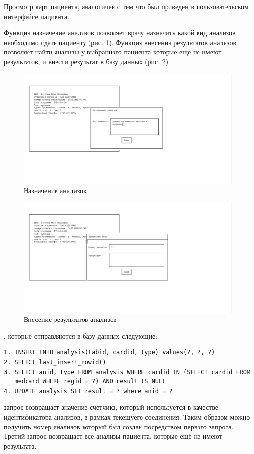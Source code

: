 \documentclass[14pt,a4paper,russian]{extreport}
\begin{document}
Просмотр карт пациента, аналогичен с тем что был приведен в пользовательском интерфейсе пациента.\par
Функция назначение анализов позволяет врачу назначить какой вид анализов необходимо сдать пациенту (рис. \ref{fig:analysis-create}).
Функция внесения результатов анализов позволяет найти анализы у выбранного пациента которые еще не имеют результатов, и внести результат в базу данных (рис. \ref{fig:analysis-update}). \par
\begin{figure}[h!]
        \includegraphics[width=\textwidth]{prog_int/analysis-create}
        \caption{Назначение анализов}
        \label{fig:analysis-create}
\end{figure}
\begin{figure}[h!]
        \includegraphics[width=\textwidth]{prog_int/analysis-update}
        \caption{Внесение результатов анализов}
        \label{fig:analysis-update}
\end{figure}
, которые отправляются в базу данных следующие: 
\begin{lstlisting}[style=csql] 
1. INSERT INTO analysis(tabid, cardid, type) values(?, ?, ?)
2. SELECT last_insert_rowid()
3. SELECT anid, type FROM analysis WHERE cardid IN (SELECT cardid FROM
   medcard WHERE regid = ?) AND result IS NULL
4. UPDATE analysis SET result = ? where anid = ?
\end{lstlisting}
 запрос возвращает значение счетчика, который используется в качестве идентификатора анализов, в рамках текещуего соединения. Таким образом можно получить номер анализов который был создан посредством первого запроса.
Третий запрос возвращает все анализы пациента, которые ещё не имеют результата.\par\par
\end{document}
